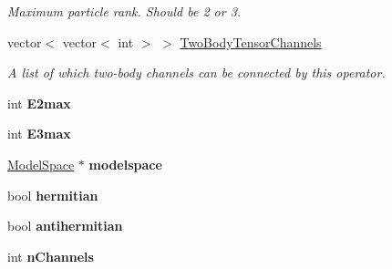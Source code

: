 \begin{DoxyCompactItemize}
\begin{DoxyCompactList}\small\item\em Maximum particle rank. Should be 2 or 3. \end{DoxyCompactList}\item 
\hypertarget{classOperator_aba9a01095cd3e3433716dc74daba4fcc}{vector$<$ vector$<$ int $>$ $>$ \hyperlink{classOperator_aba9a01095cd3e3433716dc74daba4fcc}{Two\-Body\-Tensor\-Channels}}\label{classOperator_aba9a01095cd3e3433716dc74daba4fcc}

\begin{DoxyCompactList}\small\item\em A list of which two-\/body channels can be connected by this operator. \end{DoxyCompactList}\item 
\hypertarget{classOperator_ace64ea3f299cfba00bc973e58ce03414}{int {\bfseries E2max}}\label{classOperator_ace64ea3f299cfba00bc973e58ce03414}

\item 
\hypertarget{classOperator_ad3ebb434f911b9cb7c54ca6990cdda8c}{int {\bfseries E3max}}\label{classOperator_ad3ebb434f911b9cb7c54ca6990cdda8c}

\item 
\hypertarget{classOperator_af08ef1c6d3ef38d08b4a6ea20b26ef22}{\hyperlink{classModelSpace}{Model\-Space} $\ast$ {\bfseries modelspace}}\label{classOperator_af08ef1c6d3ef38d08b4a6ea20b26ef22}

\item 
\hypertarget{classOperator_ad46a54204c51cf5c82e4c489217bd2c1}{bool {\bfseries hermitian}}\label{classOperator_ad46a54204c51cf5c82e4c489217bd2c1}

\item 
\hypertarget{classOperator_a86dd30fca215948dd9307fa45b7a2e32}{bool {\bfseries antihermitian}}\label{classOperator_a86dd30fca215948dd9307fa45b7a2e32}

\item 
\hypertarget{classOperator_a710cd3c6107a4497e90a04c1f3d2b15f}{int {\bfseries n\-Channels}}\label{classOperator_a710cd3c6107a4497e90a04c1f3d2b15f}

\end{DoxyCompactItemize}
